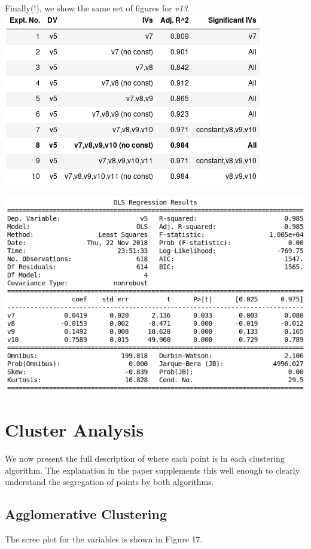 \documentclass[12pt,a4paper]{article}
\begin{document}
Finally(!), we show the same set of figures for \textit{v13}.\\

\includegraphics[scale=0.5]{v5_sub_reg.png}
\begingroup
{}
\endgroup
\hfill\break

\includegraphics[scale=0.5]{v5_sub_exp.png}
\begingroup
{}
\endgroup

\section{Cluster Analysis}
We now present the full description of where each point is in each clustering algorithm. The explanation in the paper supplements this well enough to clearly understand the segregation of points by both algorithms.

\subsection{Agglomerative Clustering}
The scree plot for the variables is shown in Figure 17.
\end{document}

